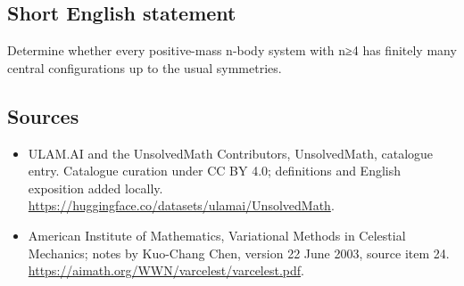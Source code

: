 \documentclass[11pt]{article}
\begin{document}
\subsection{Short English statement}
Determine whether every positive-mass n-body system with n≥4 has finitely many central configurations up to the usual symmetries.
\subsection{Sources}
\begin{itemize}
\item[\hypertarget{source:statement:1}{S1}] ULAM.AI and the UnsolvedMath Contributors, UnsolvedMath, catalogue entry. Catalogue curation under CC BY 4.0; definitions and English exposition added locally.
\url{https://huggingface.co/datasets/ulamai/UnsolvedMath}.
\item[\hypertarget{source:statement:2}{S2}] American Institute of Mathematics, Variational Methods in Celestial Mechanics; notes by Kuo-Chang Chen, version 22 June 2003, source item 24.
\url{https://aimath.org/WWN/varcelest/varcelest.pdf}.
\end{itemize}
\label{end:statement}
\end{document}
